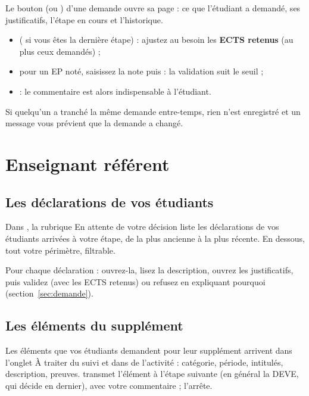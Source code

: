 \documentclass[11pt,a4paper]{article}
\begin{document}
Le bouton  (ou ) d'une demande ouvre sa page : ce que
l'étudiant a demandé, ses justificatifs, l'étape en cours et l'historique.


\begin{itemize}
  \item {} ( si vous êtes la dernière étape) :
    ajustez au besoin les \textbf{ECTS retenus} (au plus ceux demandés) ;
  \item pour un EP noté, saisissez la note puis  : la validation
    suit le seuil ;
  \item {} : le commentaire est alors indispensable à l'étudiant.
\end{itemize}

Si quelqu'un a tranché la même demande entre-temps, rien n'est enregistré et un message vous
prévient que la demande a changé.

\section{Enseignant référent}\label{sec:referent}

\subsection{Les déclarations de vos étudiants}

Dans , la rubrique \og En attente de votre décision\fg{} liste les
déclarations de vos étudiants arrivées à votre étape, de la plus ancienne à la plus récente.
En dessous, tout votre périmètre, filtrable.


Pour chaque déclaration : ouvrez-la, lisez la description, ouvrez les justificatifs, puis
validez (avec les ECTS retenus) ou refusez en expliquant pourquoi (section~\ref{sec:demande}).

\subsection{Les éléments du supplément}

Les éléments que vos étudiants demandent pour leur supplément arrivent dans l'onglet
\og À traiter\fg{} du suivi et dans  de l'activité :
catégorie, période, intitulés, description, preuves.  transmet l'élément à
l'étape suivante (en général la DEVE, qui décide en dernier), avec votre commentaire ;
 l'arrête.
\end{document}
